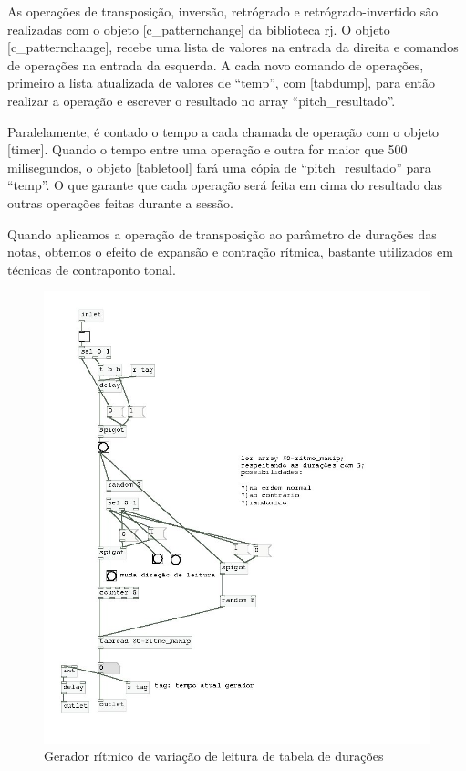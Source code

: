 \documentclass{ppgmus}
\begin{document}
As operações de transposição, inversão, retrógrado e retrógrado-invertido são 
realizadas com o objeto [c\_patternchange] da biblioteca rj. 
O objeto [c\_patternchange], recebe uma lista de valores na entrada
da direita e comandos de operações na entrada da esquerda. A cada novo
comando de operações, primeiro a lista atualizada de valores de ``temp'', 
com [tabdump], para então realizar a operação e escrever o resultado no
array ``pitch\_resultado''.

Paralelamente, é contado o tempo a cada chamada de operação com o objeto
[timer]. Quando o tempo entre uma operação e outra for maior que 500 milisegundos,
o objeto [tabletool] fará uma cópia de ``pitch\_resultado'' para ``temp''. O 
que garante que cada operação será feita em cima do resultado das outras operações
feitas durante a sessão. 

Quando aplicamos a operação de transposição ao parâmetro
de durações das notas, obtemos o efeito de expansão e contração
rítmica, bastante utilizados em técnicas de contraponto tonal.

\begin{figure}
\includegraphics[scale=.6]{gerador-ritmico1}
\caption{Gerador rítmico de variação de leitura de tabela de durações}
\label{gera-ritmico1}
\end{figure}  
\end{document}
